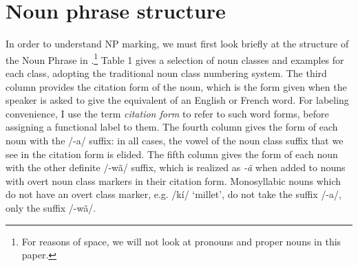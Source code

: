 \documentclass[output=paper]{langsci/langscibook}
\begin{document}
\section{Noun phrase structure}\label{sec:teo:4}
In order to understand NP marking, we must first look briefly at the structure of the Noun Phrase in .\footnote{For reasons of space, we will not look at pronouns and proper nouns in this paper.} Table 1 gives a selection of noun classes and examples for each class, adopting the traditional  noun class numbering system. The third column provides the citation form of the noun, which is the form given when the speaker is asked to give the  equivalent of an English or French word. For labeling convenience, I use the term \textit{citation form} to refer to such word forms, before assigning a functional label to them. The fourth column gives the form of each noun with the /-a/ suffix: in all cases, the vowel of the noun class suffix that we see in the citation form is elided. The fifth column gives the form of each noun with the other definite /-wã/ suffix, which is realized as \textit{-ã} when added to nouns with overt noun class markers in their citation form. Monosyllabic nouns which do not have an overt class marker, e.g. /kí/ ‘millet’, do not take the suffix /-a/, only the suffix /-wã/.
\end{document}
